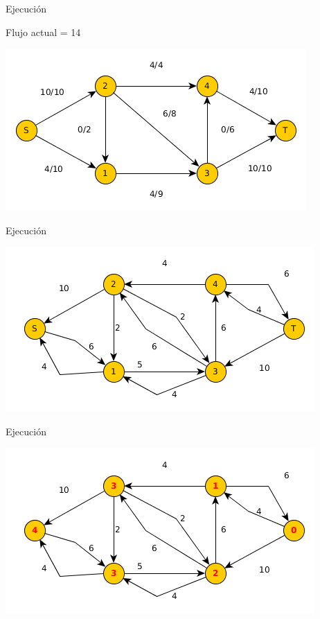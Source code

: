 \documentclass{beamer}
\begin{document}
\begin{frame}{Ejecución}

    Flujo actual = 14
    
    \includegraphics[scale=0.6]{dinitz/dinitz17.png}
    
\end{frame}

\begin{frame}{Ejecución}

    
    \includegraphics[scale=0.6]{dinitz/dinitz18.png}
    
\end{frame}

\begin{frame}{Ejecución}

    
    \includegraphics[scale=0.6]{dinitz/dinitz19.png}
    
\end{frame}
\end{document}
